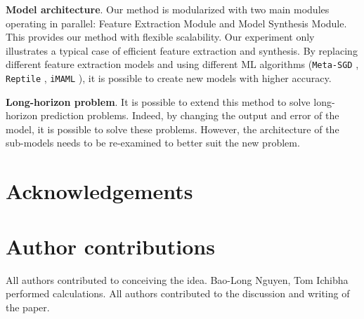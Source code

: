 \documentclass[aps,prb,groupedaddress,twocolumn,showpacs,dvipdfmx,superscriptaddress,pdftex]{revtex4-2}
\begin{document}
\textbf{Model architecture}. Our method is modularized with two main modules operating in parallel: Feature Extraction Module and Model Synthesis Module. This provides our method with flexible scalability. Our experiment only illustrates a typical case of efficient feature extraction and synthesis. By replacing different feature extraction models and using different ML algorithms (\verb|Meta-SGD| \cite{li2017meta}, \verb|Reptile| \cite{nichol2018first}, \verb|iMAML| \cite{rajeswaran2019meta}), it is possible to create new models with higher accuracy.

\vspace{2mm}


\textbf{Long-horizon problem}. It is possible to extend this method to solve long-horizon prediction problems. Indeed, by changing the output and error of the model, it is possible to solve these problems. However, the architecture of the sub-models needs to be re-examined to better suit the new problem.


\section{Acknowledgements}

\section{Author contributions}
All authors contributed to conceiving the idea. Bao-Long Nguyen, Tom Ichibha performed calculations. All authors contributed to the discussion and writing of the paper.
\end{document}
